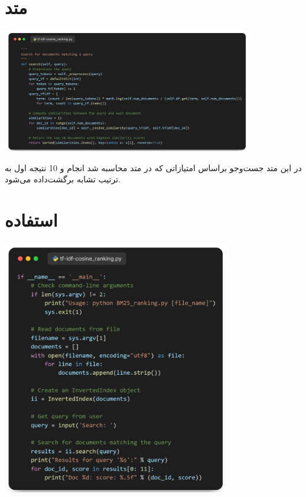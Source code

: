 \documentclass[12pt, dvipsnames, svgnames, x11names,]{article}
\begin{document}
				
	\section{متد }
		
		\begin{center}
			{\includegraphics[width=11cm]{images/11.png}}
		\end{center}
		
		{\normalsize 
			در این متد جست‌و‌جو براساس امتیازاتی که در متد  محاسبه شد انجام و 10 نتیجه اول به ترتیب تشابه برگشت‌داده می‌شود.
		}
		
			
	\section{استفاده}
	
		\begin{center}
			{\includegraphics[width=10cm]{images/12.png}} \par
		\end{center}
	
\end{document}
